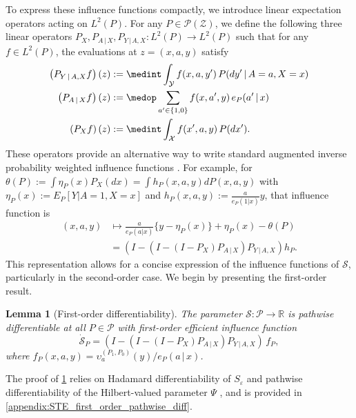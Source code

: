 \documentclass{article}
\theoremstyle{plain}
\newtheorem{lemma}[theorem]{Lemma}
\theoremstyle{definition}
\theoremstyle{remark}
\newcommand{\R}{\mathbb{R}}
\newcommand{\of}[1]{\left(#1\right)}
\newcommand{\cZ}{\mathcal{Z}}
\newcommand{\cP}{\mathcal{P}}
\newcommand{\cY}{\mathcal{Y}}
\newcommand{\cX}{\mathcal{X}}
\newcommand{\1}{\mathbbm{1}}
\newcommand{\STE}{\mathscr{S}}
\newcommand{\eps}{\varepsilon}
\theoremstyle{plain}
\theoremstyle{definition}
\newcommand{\mymid}{\,|\,}
\begin{document}
To express these influence functions compactly, we introduce linear expectation operators acting on $L^2(P)$. For any $P \in \cP(\cZ)$, we define the following three linear operators $P_X, P_{A \mymid X}, P_{Y \mymid A, X}: L^2(P) \to L^2(P)$ such that for any $f\in L^2(P)$, the evaluations at $z = (x,a,y)$ satisfy
\begin{align}\label{eq:expectation_operators}
    \of{P_{Y \mymid A, X} f}(z) &:=  \medint\int_\cY f(x, a, y^\prime) \, P(dy^\prime \mymid A=a, X=x) \nonumber\\
    \of{P_{A \mymid X} f}(z) &:= \medop\sum\limits_{a^\prime \in \{1,0\}} f(x, a^\prime, y) \, e_P(a^\prime \mymid x) \nonumber\\
    \of{P_{X} f}(z) &:= \medint\int_\cX f(x^\prime, a, y)\, P(dx^\prime).
\end{align}
These operators provide an alternative way to write standard augmented inverse probability weighted influence functions \citep{robins1994estimation}. For example, for $\theta(P):=\int \eta_P(x) P_X(dx)= \int h_P(x,a,y)dP(x,a,y)$ with $\eta_P(x):=E_P[Y|A=1,X=x]$ and $h_P(x,a,y):=\frac{a}{e_P(1|x)}y$, that influence function is
\begin{align*}
    (x,a,y)&\mapsto \frac{a}{e_P(a|x)}\{y-\eta_P(x)\} + \eta_P(x) - \theta(P) \\
    &= \of{I -  \of{ I - (I - P_X) P_{A \mymid X} } P_{Y \mymid A, X}}h_P.
\end{align*}
This representation allows for a concise expression of the influence functions of $\STE$, particularly in the second-order case. We begin by presenting the first-order result.


\begin{lemma}[First-order differentiability]\label{lem:first_order_EIF}
    The parameter $\STE: \cP \to \R$ is pathwise differentiable at all $P \in \cP$ with first-order efficient influence function
    \begin{equation}\label{eq:first-order-EIF}
        \dot{\STE}_P = \of{I -  \of{ I - (I - P_X) P_{A \mymid X} } P_{Y \mymid A, X}} \, f_P,
    \end{equation}
    where $f_P(x,a,y) = \upsilon_{a}^{(P_1, P_0)}(y)/e_P(a \mymid x)$.
\end{lemma}
The proof of \cref{lem:first_order_EIF} relies on Hadamard differentiability of $S_\eps$ \cite{kokot2025coreset} and pathwise differentiability of the Hilbert-valued parameter $\Psi$ \cite{luedtke2024one}, and is provided in \cref{appendix:STE_first_order_pathwise_diff}.
\end{document}
